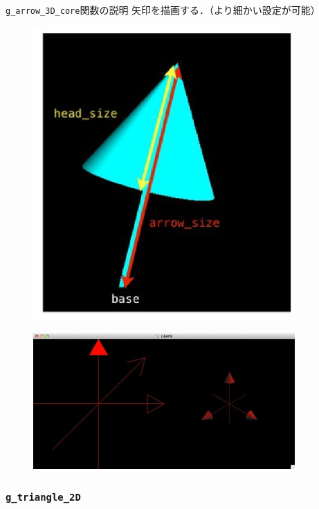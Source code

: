 \documentclass[a4paper,12pt]{jsarticle}%
\begin{document}
\begin{itembox}[l]{\texttt{g\_arrow\_3D\_core}関数の説明}
矢印を描画する．（より細かい設定が可能）
\end{itembox}
\begin{figure}[htb]
	\includegraphics[width=100mm]{./Figures/eps/Canvas_g_arrow.eps}
\end{figure}

\begin{figure}[htb]
	\includegraphics[width=100mm]{./Figures/eps/Canvas_g_arrow2.eps}
\end{figure}




\clearpage
\subsubsection{\texttt{g\_triangle\_2D}}
\end{document}

